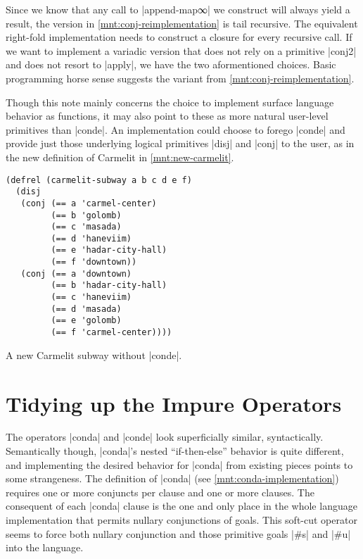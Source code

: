 \documentclass[sigplan,screen,draft,anonymous,review,natbib=false]{acmart}
\begin{document}
Since we know that any call to \rackinline|append-map∞| we construct
will always yield a result, the version in
\cref{mnt:conj-reimplementation} is tail recursive. The equivalent
right-fold implementation needs to construct a closure for every
recursive call. If we want to implement a variadic version that does
not rely on a primitive \rackinline|conj2| and does not resort to
\rackinline|apply|, we have the two aformentioned choices. Basic
programming horse sense suggests the variant from
\cref{mnt:conj-reimplementation}.

Though this note mainly concerns the choice to implement surface
language behavior as functions, it may also point to these as more
natural user-level primitives than \rackinline|conde|. An
implementation could choose to forego \rackinline|conde| and provide
just those underlying logical primitives \rackinline|disj|  and \rackinline|conj|
 to the user, as in the new definition of Carmelit in
\cref{mnt:new-carmelit}.

\begin{listing}
  \begin{verbatim}
(defrel (carmelit-subway a b c d e f)
  (disj
   (conj (== a 'carmel-center)
         (== b 'golomb)
         (== c 'masada)
         (== d 'haneviim)
         (== e 'hadar-city-hall)
         (== f 'downtown))
   (conj (== a 'downtown)
         (== b 'hadar-city-hall)
         (== c 'haneviim)
         (== d 'masada)
         (== e 'golomb)
         (== f 'carmel-center))))
  \end{verbatim}
  \caption{A new Carmelit subway without \rackinline|conde|.}
  \label{mnt:new-carmelit}
\end{listing}

\section{Tidying up the Impure Operators}\label{sec:impure}

The operators \rackinline|conda| and \rackinline|conde| look
superficially similar, syntactically. Semantically though,
\rackinline|conda|'s nested \enquote{if-then-else} behavior is quite
different, and implementing the desired behavior for
\rackinline|conda| from existing pieces points to some strangeness.
The definition of \rackinline|conda| (see
\cref{mnt:conda-implementation}) requires one or more conjuncts per
clause and one or more clauses. The consequent of each
\rackinline|conda| clause is the one and only place in the whole
language implementation that permits nullary conjunctions of goals.
This soft-cut operator seems to force both nullary conjunction and
those primitive goals \rackinline|#s| and \rackinline|#u| into the
language.
\end{document}
